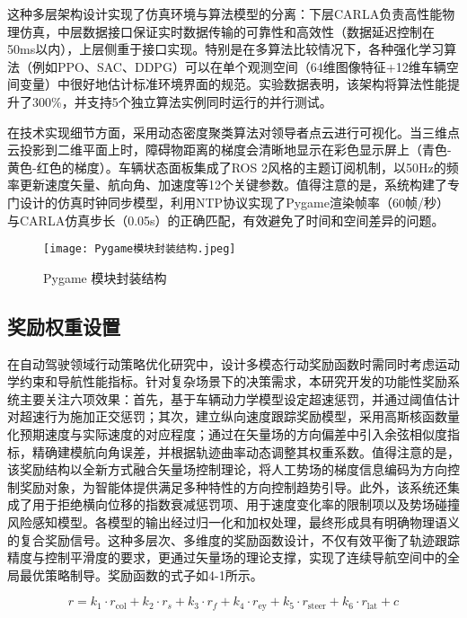 这种多层架构设计实现了仿真环境与算法模型的分离：下层CARLA负责高性能物理仿真，中层数据接口保证实时数据传输的可靠性和高效性（数据延迟控制在50ms以内），上层侧重于接口实现。特别是在多算法比较情况下，各种强化学习算法（例如PPO、SAC、DDPG）可以在单个观测空间（64维图像特征+12维车辆空间变量）中很好地估计标准环境界面的规范。实验数据表明，该架构将算法性能提升了300\%，并支持5个独立算法实例同时运行的并行测试。

在技​​术实现细节方面，采用动态密度聚类算法对领导者点云进行可视化。当三维点云投影到二维平面上时，障碍物距离的梯度会清晰地显示在彩色显示屏上（青色-黄色-红色的梯度）。车辆状态面板集成了ROS 2风格的主题订阅机制，以50Hz的频率更新速度矢量、航向角、加速度等12个关键参数。值得注意的是，系统构建了专门设计的仿真时钟同步模型，利用NTP协议实现了Pygame渲染帧率（60帧/秒）与CARLA仿真步长（0.05s）的正确匹配，有效避免了时间和空间差异的问题。

\begin{figure}[hbt]
	\centering
	\texttt{[image: Pygame模块封装结构.jpeg]}
	\caption{Pygame 模块封装结构}
	\label{f.example}
\end{figure}

\subsection{奖励权重设置}

在自动驾驶领域行动策略优化研究中，设计多模态行动奖励函数时需同时考虑运动学约束和导航性能指标。针对复杂场景下的决策需求，本研究开发的功能性奖励系统主要关注六项效果：首先，基于车辆动力学模型设定超速惩罚，并通过阈值估计对超速行为施加正交惩罚；其次，建立纵向速度跟踪奖励模型，采用高斯核函数量化预期速度与实际速度的对应程度；通过在矢量场的方向偏差中引入余弦相似度指标，精确建模航向角误差，并根据轨迹曲率动态调整其权重系数。值得注意的是，该奖励结构以全新方式融合矢量场控制理论，将人工势场的梯度信息编码为方向控制奖励对象，为智能体提供满足多种特性的方向控制趋势引导。此外，该系统还集成了用于拒绝横向位移的指数衰减惩罚项、用于速度变化率的限制项以及势场碰撞风险感知模型。各模型的输出经过归一化和加权处理，最终形成具有明确物理语义的复合奖励信号。这种多层次、多维度的奖励函数设计，不仅有效平衡了轨迹跟踪精度与控制平滑度的要求，更通过矢量场的理论支撑，实现了连续导航空间中的全局最优策略制导。奖励函数的式子如4-1所示。

\begin{equation}
	r = k_1 \cdot r_{\text{col}} + k_2 \cdot r_s + k_3 \cdot r_f + k_4 \cdot r_{\text{ey}} + k_5 \cdot r_{\text{steer}} + k_6 \cdot r_{\text{lat}} + c
\end{equation}

